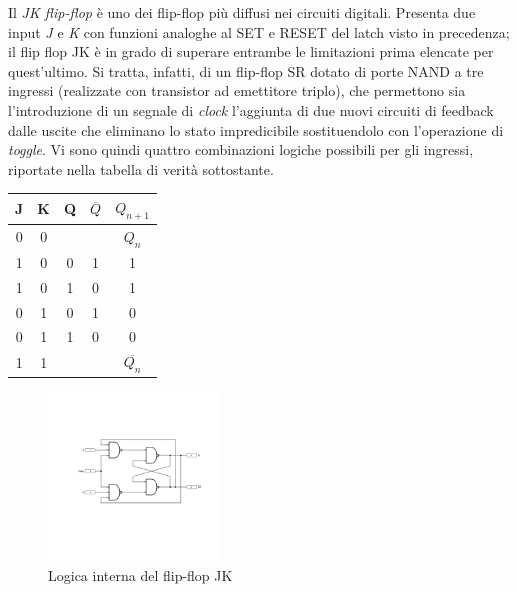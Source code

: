 \documentclass[journal]{IEEEtran}
\begin{document}
Il \textit{JK flip-flop} è uno dei flip-flop più diffusi nei circuiti digitali. Presenta due input \textit{J} e \textit{K} con funzioni analoghe al SET e RESET del latch visto in precedenza; il flip flop JK è in grado di superare entrambe le limitazioni prima elencate per quest'ultimo. Si tratta, infatti, di un flip-flop SR dotato di porte NAND a tre ingressi (realizzate con transistor ad emettitore triplo), che permettono sia l'introduzione di un segnale di \textit{clock} l'aggiunta di due nuovi circuiti di feedback dalle uscite che eliminano lo stato impredicibile sostituendolo con l'operazione di \textit{toggle}. Vi sono quindi quattro combinazioni logiche possibili per gli ingressi, riportate nella tabella di verità sottostante.
\newline
\begin{center}
\begin{tabular}{ |c|c|c|c|c| } 
 \hline
 \rowcolor{lightgray}
 J & K & Q & $\overline{Q}$ & $ Q_{n + 1} $ \\ \hline \hline
 0 & 0 &  &  & $Q_n$ \\ \hline
 1 & 0 & 0 & 1 & 1 \\ \hline
 1 & 0 & 1 & 0 & 1\\ \hline
 0 & 1 & 0 & 1 & 0 \\ \hline
 0 & 1 & 1 & 0 & 0 \\ \hline
 1 & 1 &  & & $\overline{Q_n}$ \\ \hline
\end{tabular}
\end{center}

\begin{figure}[H]%
\centering
\begin{center}
\includegraphics[width=0.40\textwidth]{sch-simulations/digital/output/flip-flop-JK.pdf}
\end{center}
\caption{Logica interna del flip-flop JK}
\label{fig:circuit_JK}
\end{figure}
\end{document}
